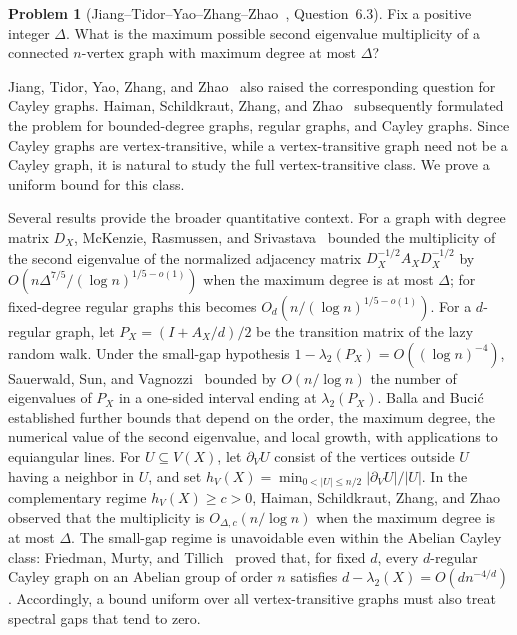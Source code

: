 \documentclass[11pt]{article}
\theoremstyle{definition}
\newtheorem{problem}[theorem]{Problem}
\theoremstyle{remark}
\begin{document}
\begin{problem}[Jiang--Tidor--Yao--Zhang--Zhao~\cite{JiangTidorYaoZhangZhao2021FixedAngle}, Question~6.3]\label{prob:jtyzz}
Fix a positive integer $\Delta$. What is the maximum possible second eigenvalue multiplicity of a connected $n$-vertex graph with maximum degree at most $\Delta$?
\end{problem}

Jiang, Tidor, Yao, Zhang, and Zhao~\cite[remark following Question~6.3]{JiangTidorYaoZhangZhao2021FixedAngle} also raised the corresponding question for Cayley graphs. Haiman, Schildkraut, Zhang, and Zhao~\cite[Question~1.2]{HaimanSchildkrautZhangZhao2022HighMultiplicity} subsequently formulated the problem for bounded-degree graphs, regular graphs, and Cayley graphs. Since Cayley graphs are vertex-transitive, while a vertex-transitive graph need not be a Cayley graph, it is natural to study the full vertex-transitive class. We prove a uniform bound for this class.

Several results provide the broader quantitative context. For a graph with degree matrix $D_X$, McKenzie, Rasmussen, and Srivastava~\cite{McKenzieRasmussenSrivastava2021ClosedWalks} bounded the multiplicity of the second eigenvalue of the normalized adjacency matrix $D_X^{-1/2}A_XD_X^{-1/2}$ by $O(n\Delta^{7/5}/(\log n)^{1/5-o(1)})$ when the maximum degree is at most $\Delta$; for fixed-degree regular graphs this becomes $O_d(n/(\log n)^{1/5-o(1)})$. For a $d$-regular graph, let $P_X=(I+A_X/d)/2$ be the transition matrix of the lazy random walk. Under the small-gap hypothesis $1-\lambda_2(P_X)=O((\log n)^{-4})$, Sauerwald, Sun, and Vagnozzi~\cite[Theorem~1.4]{SauerwaldSunVagnozzi2023Support} bounded by $O(n/\log n)$ the number of eigenvalues of $P_X$ in a one-sided interval ending at $\lambda_2(P_X)$. Balla and Buci\'c~\cite{BallaBucic2024ImprovedMultiplicity} established further bounds that depend on the order, the maximum degree, the numerical value of the second eigenvalue, and local growth, with applications to equiangular lines. For $U\subseteq V(X)$, let $\partial_VU$ consist of the vertices outside $U$ having a neighbor in $U$, and set $h_V(X)=\min_{0<|U|\leq n/2}|\partial_VU|/|U|$. In the complementary regime $h_V(X)\geq c>0$, Haiman, Schildkraut, Zhang, and Zhao~\cite[Remark~1.3(a)]{HaimanSchildkrautZhangZhao2022HighMultiplicity} observed that the multiplicity is $O_{\Delta,c}(n/\log n)$ when the maximum degree is at most $\Delta$. The small-gap regime is unavoidable even within the Abelian Cayley class: Friedman, Murty, and Tillich~\cite{FriedmanMurtyTillich2006Abelian} proved that, for fixed $d$, every $d$-regular Cayley graph on an Abelian group of order $n$ satisfies $d-\lambda_2(X)=O(dn^{-4/d})$. Accordingly, a bound uniform over all vertex-transitive graphs must also treat spectral gaps that tend to zero.
\end{document}
